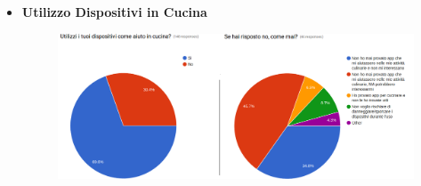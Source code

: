\begin{itemize}
\begin{figure} [H]
		\end{figure}
	\item\textbf{Utilizzo Dispositivi in Cucina}
		\begin{figure} [H]
			\centering
			\includegraphics[scale=0.40]{img/survey-78.png}
		\end{figure}
		

\end{itemize}
